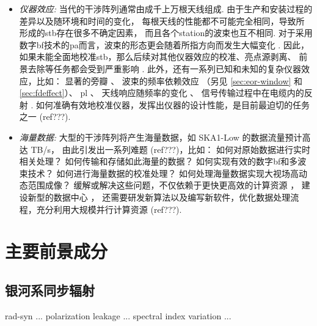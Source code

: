 \begin{itemize}
\item
\emph{仪器效应:}
当代的干涉阵列通常由成千上万根天线组成. 由于生产和安装过程的差异以及随环境和时间的变化，
每根天线的性能都不可能完全相同，导致所形成的\ac{stb}存在很多不确定因素，
而且各个\ac{station}的波束也互不相同.
对于采用数字\ac{bf}技术的\ac{pa}而言，波束的形态更会随着所指方向而发生大幅变化
\cite{smirnov2011iii,vanWeeren2016,jagannathan2017}.
因此，如果未能全面地校准\ac{stb}，那么后续对其他仪器效应的校准、亮点源剥离、
前景去除等任务都会受到严重影响 \cite{noordam2004,neben2016}.
此外，还有一系列已知和未知的复杂仪器效应，比如：
显著的旁瓣 \cite{thyagarajan2015,mort2017}、
波束的频率依赖效应 \cite{liu2009ps,datta2010,morales2012}
（另见 \autoref{sec:eor-window} 和 \autoref{sec:fdeffect}）、
\ac{pl} \cite{asad2016,asad2018,lenc2017}、
天线响应随频率的变化 \cite{bernardi2015,trott2017}、
信号传输过程中在电缆内的反射 \cite{beardsley2016}.
如何准确有效地校准仪器，发挥出仪器的设计性能，是目前最迫切的任务之一
\cite{wijnholds2010} (ref???).

\item
\emph{海量数据:}
大型的干涉阵列将产生海量数据，如 SKA1-Low 的数据流量预计高达 TB/s，
由此引发出一系列难题 \cite{norris2011} (ref???)，比如：
如何对原始数据进行实时相关处理？
如何传输和存储如此海量的数据？
如何实现有效的数字\ac{bf}和多波束技术？
如何进行海量数据的校准处理？
如何处理海量数据实现大视场高动态范围成像？
缓解或解决这些问题，不仅依赖于更快更高效的计算资源 \cite{magro2014,vermij2017}，
建设新型的数据中心 \cite{chrysostomou2018}，
还需要研发新算法以及编写新软件，优化数据处理流程，充分利用大规模并行计算资源
\cite{morales2009,gunst2018} (ref???).

\end{itemize}


\section{主要前景成分}
\label{sec:fg-intro}

\subsection{银河系同步辐射}

\ac{rad-syn} ...
polarization leakage ...
spectral index variation ...

